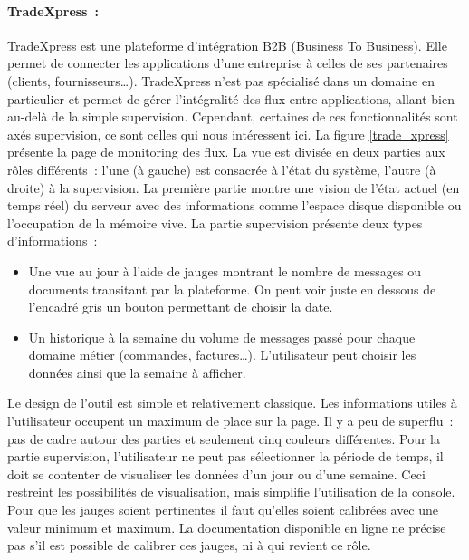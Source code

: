 			\paragraph{TradeXpress~:}
			TradeXpress est une plateforme d’intégration B2B (Business To Business).
			Elle permet de connecter les applications d’une entreprise à celles de ses
			partenaires (clients, fournisseurs…). TradeXpress n’est pas spécialisé dans un
			domaine en particulier et permet de gérer l’intégralité des flux entre
			applications, allant bien au-delà de la simple supervision. Cependant, certaines
			de ces fonctionnalités sont axés supervision, ce sont celles qui nous
			intéressent ici. La figure \ref{trade_xpress} présente la page de monitoring des
			flux.\newline
			La vue est divisée en deux parties aux rôles
			différents~: l'une (à gauche) est consacrée à l’état du système, l'autre (à
			droite) à la supervision. La première partie montre une vision de l’état
			actuel (en temps réel) du serveur avec des informations comme l'espace
			disque disponible ou l'occupation de la mémoire vive.
			La partie supervision présente deux types d'informations~:
			\begin{itemize}
			  \item Une vue au jour à l’aide de jauges montrant le nombre de messages ou
			  documents transitant par la plateforme. On peut voir juste en dessous de
			  l’encadré gris un bouton permettant de choisir la date.
			  \item Un historique à la semaine du volume de messages passé pour chaque
			  domaine métier (commandes, factures\ldots). L’utilisateur peut choisir les
			  données ainsi que la semaine à afficher.
			\end{itemize}
			Le design de l’outil est simple et relativement classique. Les informations
			utiles à l’utilisateur occupent un maximum de place sur la page. Il y a peu
			de superflu~: pas de cadre autour des parties et seulement cinq couleurs différentes.\newline
			Pour la partie supervision, l’utilisateur ne peut pas sélectionner la
			période de temps, il doit se contenter de visualiser les données d’un jour
			ou d’une semaine. Ceci restreint les possibilités de
			visualisation, mais simplifie l’utilisation de la console.\newline
			Pour que les jauges soient pertinentes il faut qu’elles soient calibrées avec
			une valeur minimum et maximum. La documentation disponible en ligne ne précise
			pas s’il est possible de calibrer ces jauges, ni à qui revient ce rôle.
